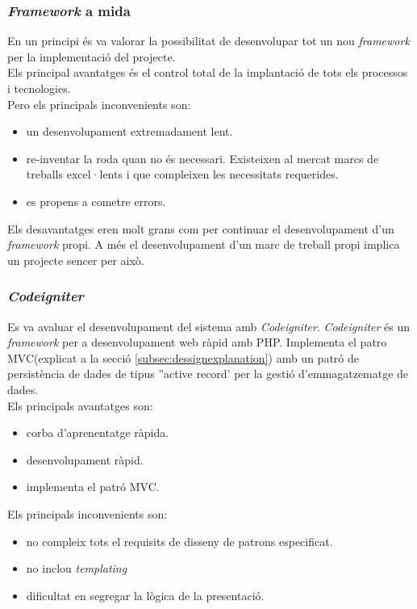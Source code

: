 \subsubsection{\textit{Framework} a mida}
En un principi \'{e}s va valorar la possibilitat de desenvolupar tot un nou \textit{framework} per la implementaci\'{o} del projecte.\\

Els principal avantatges \'{e}s el control total de la implantaci\'{o} de tots els processos i tecnologies.\\

Pero els principals inconvenients son:
\begin{itemize} 
\item un desenvolupament extremadament lent. 
\item re-inventar la roda quan no \'{e}s necessari. Existeixen al mercat marcs de treballs excel·lents i que compleixen les necessitats requerides.
\item es propens a cometre errors.
\end{itemize} 

Els desavantatges eren molt grans com per continuar el desenvolupament d'un \textit{framework} propi. A m\'{e}s el desenvolupament d'un marc de treball propi implica un projecte sencer per això.

\subsubsection{\textit{Codeigniter}}
Es va avaluar el desenvolupament del sistema amb \textit{Codeigniter}. \textit{Codeigniter} \'{e}s un \textit{framework} per a desenvolupament web r\`{a}pid amb PHP.\cite{codeigniter} Implementa el patro MVC(explicat a la secció \ref{subsec:dessignexplanation}) amb un patró de persistència de dades de tipus ''active record' per la gesti\'{o} d'emmagatzematge de dades.\cite{activerecord}\\

Els principals avantatges son:
\begin{itemize}
\item corba d'aprenentatge r\`{a}pida.
\item desenvolupament r\`{a}pid.
\item implementa el patr\'{o} MVC.
\end{itemize}

Els principals inconvenients son:
\begin{itemize}
\item no compleix tots el requisits de disseny de patrons especificat.
\item no inclou \textit{templating}
\item dificultat en segregar la l\`{o}gica de la presentaci\'{o}.
\end{itemize}

